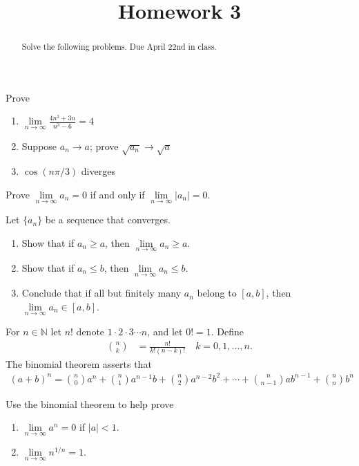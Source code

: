 \documentclass{ximera}
\begin{document}
    \title{Homework 3}
    \begin{abstract} Solve the following problems.  Due April 22nd in class. \end{abstract}
    \maketitle

\begin{exercise}
    Prove 
    \begin{enumerate}
        \item $\lim\limits_{n\to\infty} \frac{4n^3+3n}{n^3-6} = 4$
        \item Suppose $a_n \to a$; prove $\sqrt{a_n}\to\sqrt{a}$
        \item $\cos(n\pi/3)$ diverges
    \end{enumerate}
\end{exercise}

\begin{exercise}
    Prove $\lim\limits_{n\to\infty} a_n = 0$ if and only if $\lim\limits_{n\to\infty} |a_n| = 0$.
\end{exercise}

\begin{exercise}
    Let $\{a_n\}$ be a sequence that converges.
    \begin{enumerate}
        \item Show that if $a_n \geq a$, then $\lim\limits_{n\to\infty} a_n \geq a$.
        \item Show that if $a_n \leq b$, then $\lim\limits_{n\to\infty} a_n \leq b$.
        \item Conclude that if all but finitely many $a_n$ belong to $[a,b]$, then $\lim\limits_{n\to\infty} a_n \in [a,b]$.
    \end{enumerate}
\end{exercise}

For $n\in\mathbb{N}$ let $n!$ denote $1\cdot 2 \cdot 3 \cdots n$, and let $0!=1$.  Define
\begin{align*}
    n\choose k &= \frac{n!}{k!(n-k)!} \quad k = 0,1,...,n.
\end{align*}
The binomial theorem asserts that 
\begin{align*}
    (a+b)^n = {n\choose 0}a^n + {n\choose 1}a^{n-1}b + {n\choose 2}a^{n-2}b^2 + \cdots + {n\choose n-1}ab^{n-1}+{n\choose n}b^{n}
\end{align*}

\begin{exercise}
    Use the binomial theorem to help prove
    \begin{enumerate}
        \item $\lim\limits_{n\to\infty} a^n = 0$ if $|a|<1$.
        \item $\lim\limits_{n\to\infty} n^{1/n} = 1$.
    \end{enumerate}
\end{exercise}
\end{document}
